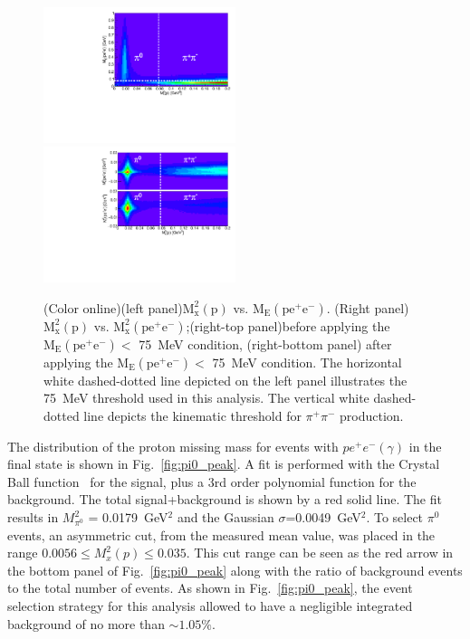 \documentclass[aps,prc,twocolumn,floatfix,showpacs,preprintnumbers,amsmath,amssymb,superscriptaddress]{revtex4-1}
\def\pizT{$\pi^{0} \ $}
\begin{document}
\begin{figure}[htb!]
	\centerline{
		\includegraphics[height=0.4\textwidth,width=0.5\textwidth]{ME_vs_mxpcompare.pdf} \label{fig:beforecut}\hfill
		\includegraphics[height=0.4\textwidth,width=0.5\textwidth]{mm2_vs_mxp_compare.pdf}
		\label{fig:aftercut}}	
	\caption{(Color online)(left panel)$\mathrm{M_x^2(p)}$ vs. $\mathrm{M_E(pe^+e^-)}$. (Right panel)$\mathrm{M_x^2(p)}$ vs. $\mathrm{M_x^2(pe^+e^-)}$;(right-top panel)before applying the $\mathrm{M_E(pe^+e^-)} <$ 75~MeV condition, (right-bottom panel) after applying the $\mathrm{M_E(pe^+e^-)} <$ 75~MeV condition. The horizontal white dashed-dotted line depicted on the left panel illustrates the 75~MeV threshold used in this analysis. The vertical white dashed-dotted line depicts the kinematic threshold for $\pi^+\pi^-$  production.	
	}\label{fig:sys}		
\end{figure}

The distribution of the proton missing mass for events
with $pe^+e^-(\gamma)$ in the final state is shown in 
Fig.~\ref{fig:pi0_peak}. A fit is performed with the Crystal Ball 
function~\cite{Ball1,Ball2} for the signal, plus a 3rd 
order polynomial function for the background. The total signal+background is shown by a red solid line. The fit results in $M_{\pi^0}^2$ = 
0.0179~GeV$^2$ and the Gaussian $\sigma$=0.0049~GeV$^2$. To select \pizT events, 
an asymmetric cut, from the measured mean value, was placed in the range $0.0056 \le  M_x^2(p) \le 0.035$. This cut range can be seen as the red arrow in the bottom panel of Fig.~\ref{fig:pi0_peak} along with the ratio of background events to the total number of events.
As shown in Fig.~\ref{fig:pi0_peak}, the event selection strategy for this analysis allowed to have a negligible integrated background of no more than $\sim1.05\%$.
\end{document}
